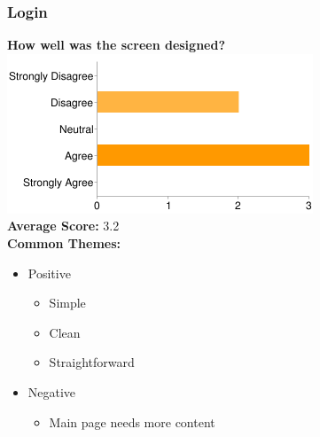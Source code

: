\subsubsection{Login}
\textbf{How well was the screen designed?}\\
\includegraphics[page=1,scale=0.65]{../other/usability-report-charts/login_bar_chart}\\
\textbf{Average Score:} 3.2\\
\textbf{Common Themes:}
\begin{itemize}
\item Positive
\begin{itemize}
\item Simple
\item Clean
\item Straightforward
\end{itemize}
\item Negative
\begin{itemize}
\item Main page needs more content
\end{itemize}
\end{itemize}

